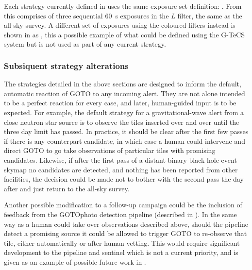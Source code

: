 \begin{colsection}
Each strategy currently defined in  uses the same exposure set definition: . From  this comprises of three sequential \SI{60}{\second} exposures in the \textit{L} filter, the same as the all-sky survey. A different set of exposures using the coloured filters instead is shown in  as , this a possible example of what could be defined using the G-TeCS system but is not used as part of any current strategy.  %

\subsubsection{Subsiquent strategy alterations}

The strategies detailed in the above sections are designed to inform the default, automatic reaction of GOTO to any incoming alert. They are not alone intended to be a perfect reaction for every case, and later, human-guided input is to be expected. For example, the default strategy for a gravitational-wave alert from a close neutron star source is to observe the tiles inserted over and over until the three day limit has passed. In practice, it should be clear after the first few passes if there is any counterpart candidate, in which case a human could intervene and direct GOTO to go take observations of particular tiles with promising candidates. Likewise, if after the first pass of a distant binary black hole event skymap no candidates are detected, and nothing has been reported from other facilities, the decision could be made not to bother with the second pass the day after and just return to the all-sky survey.

Another possible modification to a follow-up campaign could be the inclusion of feedback from the GOTOphoto detection pipeline (described in ). In the same way as a human could take over observations described above, should the pipeline detect a promising source it could be allowed to trigger GOTO to re-observe that tile, either automatically or after human vetting. This would require significant development to the pipeline and sentinel which is not a current priority, and is given as an example of possible future work in .

\newpage

\end{colsection}


